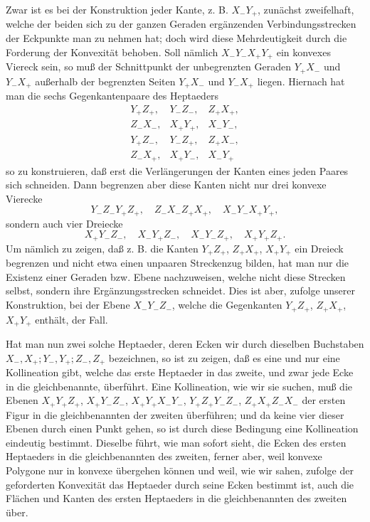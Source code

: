 \documentclass[11pt,a4paper]{article}
\begin{document}
Zwar ist es bei der Konstruktion jeder Kante, z. B. $X_-Y_+$, zun\"achst zweifelhaft, welche der beiden sich zu der ganzen Geraden erg\"anzenden Verbindungsstrecken der Eckpunkte man zu nehmen hat; doch wird diese Mehrdeutigkeit durch die Forderung der Konvexit\"at behoben. Soll n\"amlich $X_-Y_-X_+Y_+$ ein konvexes Viereck sein, so mu\ss{} der Schnittpunkt der unbegrenzten Geraden $Y_+X_-$ und $Y_-X_+$ au\ss{}erhalb der begrenzten Seiten $Y_+X_-$ und $Y_-X_+$ liegen. Hiernach hat man die sechs Gegenkantenpaare des Heptaeders
\[
\begin{array}{lll}
Y_+Z_+,
&Y_-Z_-,
&Z_+X_+,\\
Z_-X_-,
&X_+Y_+,
&X_-Y_-,\\
Y_+Z_-,
&Y_-Z_+,
&Z_+X_-,\\
Z_-X_+,
&X_+Y_-,
&X_-Y_+
\end{array}
\]
so zu konstruieren, da\ss{} erst die Verl\"angerungen der Kanten eines jeden Paares sich schneiden. Dann begrenzen aber diese Kanten nicht nur drei konvexe Vierecke
\[
 Y_-Z_-Y_+Z_+,
 \quad Z_-X_-Z_+X_+,
 \quad X_-Y_-X_+Y_+,
\]
sondern auch vier Dreiecke
\[
 X_+Y_-Z_-,
 \quad X_-Y_+Z_-,
 \quad X_-Y_-Z_+,
 \quad X_+Y_+Z_+.
\]
Um n\"amlich zu zeigen, da\ss{} z. B. die Kanten $Y_+Z_+$, $Z_+X_+$, $X_+Y_+$ ein Dreieck begrenzen und nicht etwa einen unpaaren Streckenzug bilden, hat man nur die Existenz einer Geraden bzw. Ebene nachzuweisen, welche nicht diese Strecken selbst, sondern ihre Erg\"anzungsstrecken schneidet. Dies ist aber, zufolge unserer Konstruktion, bei der Ebene $X_-Y_-Z_-$, welche die Gegenkanten $Y_+Z_+$, $Z_+X_+$, $X_+Y_+$ enth\"alt, der Fall.

Hat man nun zwei solche Heptaeder, deren Ecken wir durch dieselben Buchstaben $X_-,X_+;Y_-,Y_+;Z_-,Z_+$ bezeichnen, so ist zu zeigen, da\ss{} es eine und nur eine Kollineation gibt, welche das erste Heptaeder in das zweite, und zwar jede Ecke in die gleichbenannte, \"uberf\"uhrt. Eine Kollineation, wie wir sie suchen, mu\ss{} die Ebenen $X_+Y_+Z_+$, $X_+Y_-Z_-$, $X_+Y_+X_-Y_-$, $Y_+Z_+Y_-Z_-$, $Z_+X_+Z_-X_-$ der ersten Figur in die gleichbenannten der zweiten \"uberf\"uhren; und da keine vier dieser Ebenen durch einen Punkt gehen, so ist durch diese Bedingung eine Kollineation eindeutig bestimmt. Dieselbe f\"uhrt, wie man sofort sieht, die Ecken des ersten Heptaeders in die gleichbenannten des zweiten, ferner aber, weil konvexe Polygone nur in konvexe \"ubergehen k\"onnen und weil, wie wir sahen, zufolge der geforderten Konvexit\"at das Heptaeder durch seine Ecken bestimmt ist, auch die Fl\"achen und Kanten des ersten Heptaeders in die gleichbenannten des zweiten \"uber.
\end{document}
